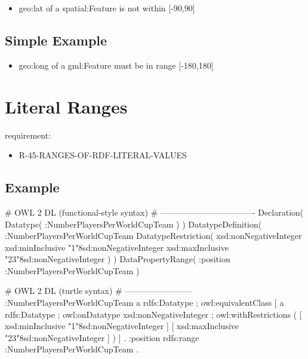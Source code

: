 \documentclass{llncs}
\begin{document}
\begin{itemize}
	\item geo:lat of a spatial:Feature is not within [-90,90]
\end{itemize}

\subsection{Simple Example}

\begin{itemize}
	\item geo:long of a gml:Feature must be in range [-180,180]
\end{itemize}



\section{Literal Ranges}

requirement:

\begin{itemize}
	\item R-45-RANGES-OF-RDF-LITERAL-VALUES
\end{itemize}



\subsection{Example}

\begin{ex}
# OWL 2 DL (functional-style syntax)
# ----------------------------------
Declaration( Datatype( :NumberPlayersPerWorldCupTeam ) ) 
DatatypeDefinition( 
    :NumberPlayersPerWorldCupTeam
    DatatypeRestriction( 
        xsd:nonNegativeInteger 
        xsd:minInclusive "1"^^xsd:nonNegativeInteger 
        xsd:maxInclusive "23"^^xsd:nonNegativeInteger ) )     
DataPropertyRange( :position :NumberPlayersPerWorldCupTeam ) 
\end{ex}

\begin{ex}
# OWL 2 DL (turtle syntax)
# ------------------------
:NumberPlayersPerWorldCupTeam
    a rdfs:Datatype ;
    owl:equivalentClass [
        a rdfs:Datatype ;
        owl:onDatatype xsd:nonNegativeInteger ;
        owl:withRestrictions ( 
            [ xsd:minInclusive "1"^^xsd:nonNegativeInteger ]
            [ xsd:maxInclusive "23"^^xsd:nonNegativeInteger ] ) ] .
:position rdfs:range :NumberPlayersPerWorldCupTeam .
\end{ex}
\end{document}
